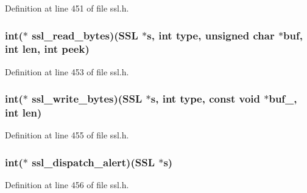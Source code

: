 Definition at line 451 of file ssl.\+h.

\subsubsection[{\texorpdfstring{ssl\+\_\+read\+\_\+bytes}{ssl_read_bytes}}]{\setlength{\rightskip}{0pt plus 5cm}int($\ast$ ssl\+\_\+read\+\_\+bytes)({\bf S\+SL} $\ast$s, int {\bf type}, unsigned char $\ast$buf, int {\bf len}, int peek)}\hypertarget{structssl__method__st_a82ffd609a31476eb45648bdebd1b3318}{}\label{structssl__method__st_a82ffd609a31476eb45648bdebd1b3318}


Definition at line 453 of file ssl.\+h.

\subsubsection[{\texorpdfstring{ssl\+\_\+write\+\_\+bytes}{ssl_write_bytes}}]{\setlength{\rightskip}{0pt plus 5cm}int($\ast$ ssl\+\_\+write\+\_\+bytes)({\bf S\+SL} $\ast$s, int {\bf type}, const {\bf void} $\ast$buf\+\_\+, int {\bf len})}\hypertarget{structssl__method__st_a0409273ba5f2ca5e607bb5afe49e60d5}{}\label{structssl__method__st_a0409273ba5f2ca5e607bb5afe49e60d5}


Definition at line 455 of file ssl.\+h.

\subsubsection[{\texorpdfstring{ssl\+\_\+dispatch\+\_\+alert}{ssl_dispatch_alert}}]{\setlength{\rightskip}{0pt plus 5cm}int($\ast$ ssl\+\_\+dispatch\+\_\+alert)({\bf S\+SL} $\ast$s)}\hypertarget{structssl__method__st_a7039177b3912cb9d5805ea781dedcf0d}{}\label{structssl__method__st_a7039177b3912cb9d5805ea781dedcf0d}


Definition at line 456 of file ssl.\+h.

